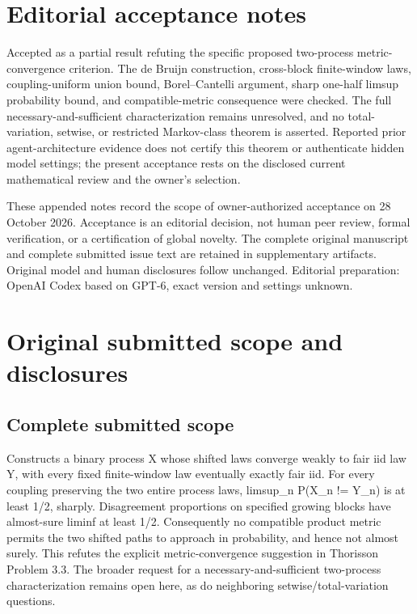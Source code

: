 \documentclass[11pt]{article}
\begin{document}
\section{Editorial acceptance notes}

Accepted as a partial result refuting the specific proposed two-process metric-convergence criterion. The de Bruijn construction, cross-block finite-window laws, coupling-uniform union bound, Borel--Cantelli argument, sharp one-half limsup probability bound, and compatible-metric consequence were checked. The full necessary-and-sufficient characterization remains unresolved, and no total-variation, setwise, or restricted Markov-class theorem is asserted. Reported prior agent-architecture evidence does not certify this theorem or authenticate hidden model settings; the present acceptance rests on the disclosed current mathematical review and the owner's selection.

These appended notes record the scope of owner-authorized acceptance on 28 October 2026. Acceptance is an editorial decision, not human peer review, formal verification, or a certification of global novelty. The complete original manuscript and complete submitted issue text are retained in supplementary artifacts. Original model and human disclosures follow unchanged. Editorial preparation: OpenAI Codex based on GPT-6, exact version and settings unknown.

\section{Original submitted scope and disclosures}

\subsection{Complete submitted scope}

Constructs a binary process X whose shifted laws converge weakly to fair iid law Y, with every fixed finite-window law eventually exactly fair iid. For every coupling preserving the two entire process laws, limsup\_n P(X\_n != Y\_n) is at least 1/2, sharply. Disagreement proportions on specified growing blocks have almost-sure liminf at least 1/2. Consequently no compatible product metric permits the two shifted paths to approach in probability, and hence not almost surely. This refutes the explicit metric-convergence suggestion in Thorisson Problem 3.3. The broader request for a necessary-and-sufficient two-process characterization remains open here, as do neighboring setwise/total-variation questions.
\end{document}
